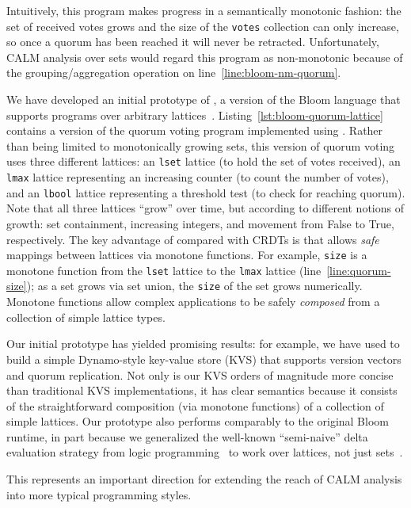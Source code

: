 Intuitively, this program makes progress in a semantically monotonic fashion:
the set of received votes grows and the size of the \texttt{votes} collection
can only increase, so once a quorum has been reached it will never be
retracted. Unfortunately, CALM analysis over sets would regard this program as
non-monotonic because of the grouping/aggregation operation on
line~\ref{line:bloom-nm-quorum}.

We have developed an initial prototype of \blooml, a version of the Bloom
language that supports programs over arbitrary
lattices~\cite{bloom-lattice-tr}. Listing~\ref{lst:bloom-quorum-lattice}
contains a version of the quorum voting program implemented using
\blooml. Rather than being limited to monotonically growing sets, this version
of quorum voting uses three different lattices: an \texttt{lset} lattice (to
hold the set of votes received), an \texttt{lmax} lattice representing an
increasing counter (to count the number of votes), and an \texttt{lbool} lattice
representing a threshold test (to check for reaching quorum). Note that all
three lattices ``grow'' over time, but according to different notions of growth:
set containment, increasing integers, and movement from False to True,
respectively. The key advantage of \blooml compared with CRDTs is that \blooml
allows \emph{safe} mappings between lattices via monotone functions. For
example, \texttt{size} is a monotone function from the \texttt{lset} lattice to
the \texttt{lmax} lattice (line~\ref{line:quorum-size}); as a set grows via set
union, the \texttt{size} of the set grows numerically. Monotone functions allow
complex applications to be safely \emph{composed} from a collection of simple
lattice types.

Our initial \blooml prototype has yielded promising results: for example, we
have used \blooml to build a simple Dynamo-style key-value store (KVS) that supports version
vectors and quorum replication. Not only is our KVS orders of magnitude more
concise than traditional KVS implementations, it has clear semantics because it
consists of the straightforward composition (via monotone functions) of a
collection of simple lattices. Our \blooml prototype also performs comparably to
the original Bloom runtime, in part because we generalized the well-known
``semi-naive'' delta evaluation strategy from logic
programming~\cite{Balbin1987} to work over lattices, not just
sets~\cite{bloom-lattice-tr}.

This represents an important direction for extending the reach of CALM analysis into more typical programming styles.  

